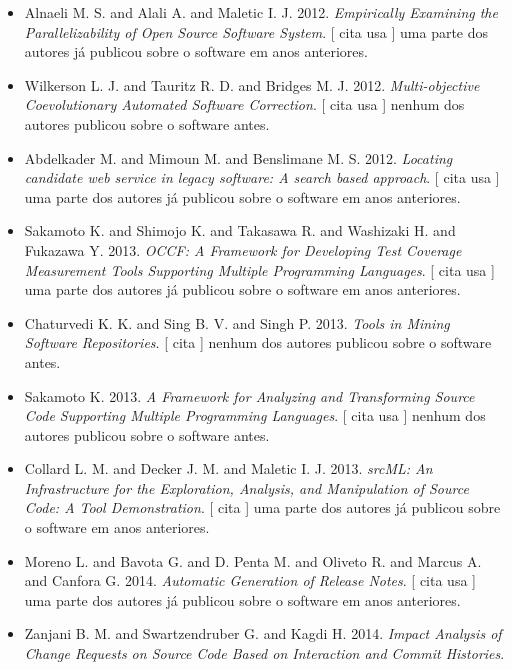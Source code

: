 \begin{itemize}
\item Alnaeli M. S. and Alali A. and Maletic I. J.
      2012.
        \textit{ Empirically Examining the Parallelizability of Open Source Software System}.
      [
          cita
          usa
      ]
uma parte dos autores já publicou sobre o software em anos anteriores.
\item Wilkerson L. J. and Tauritz R. D. and Bridges M. J.
      2012.
        \textit{ Multi-objective Coevolutionary Automated Software Correction}.
      [
          cita
          usa
      ]
nenhum dos autores publicou sobre o software antes.
\item Abdelkader M. and Mimoun M. and Benslimane M. S.
      2012.
        \textit{ Locating candidate web service in legacy software: A search based approach}.
      [
          cita
          usa
      ]
uma parte dos autores já publicou sobre o software em anos anteriores.
\item Sakamoto K. and Shimojo K. and Takasawa R. and Washizaki H. and Fukazawa Y.
      2013.
        \textit{ OCCF: A Framework for Developing Test Coverage Measurement Tools Supporting Multiple Programming Languages}.
      [
          cita
          usa
      ]
uma parte dos autores já publicou sobre o software em anos anteriores.
\item Chaturvedi K. K. and Sing B. V. and Singh P.
      2013.
        \textit{ Tools in Mining Software Repositories}.
      [
          cita
      ]
nenhum dos autores publicou sobre o software antes.
\item Sakamoto K.
      2013.
        \textit{ A Framework for Analyzing and Transforming Source Code Supporting Multiple Programming Languages}.
      [
          cita
          usa
      ]
nenhum dos autores publicou sobre o software antes.
\item Collard L. M. and Decker J. M. and Maletic I. J.
      2013.
        \textit{ srcML: An Infrastructure for the Exploration, Analysis, and Manipulation of Source Code: A Tool Demonstration}.
      [
          cita
      ]
uma parte dos autores já publicou sobre o software em anos anteriores.
\item Moreno L. and Bavota G. and D. Penta M. and Oliveto R. and Marcus A. and Canfora G.
      2014.
        \textit{ Automatic Generation of Release Notes}.
      [
          cita
          usa
      ]
uma parte dos autores já publicou sobre o software em anos anteriores.
\item Zanjani B. M. and Swartzendruber G. and Kagdi H.
      2014.
        \textit{ Impact Analysis of Change Requests on Source Code Based on Interaction and Commit Histories}.

\end{itemize}
